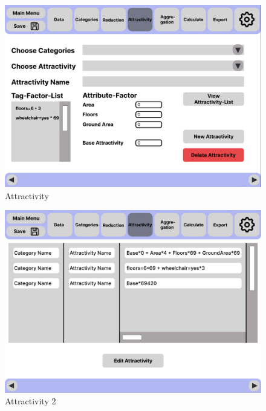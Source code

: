 \documentclass[parskip=full]{scrartcl} %
\begin{document}
\begin{figure}
    \centering
    \includegraphics[width=1\textwidth]{pictures/Attractivity.png}
    \caption{Attractivity}
\end{figure}

\begin{figure}
    \centering
    \includegraphics[width=1\textwidth]{pictures/Attractivity 2.png}
    \caption{Attractivity 2}
\end{figure}
\end{document}
